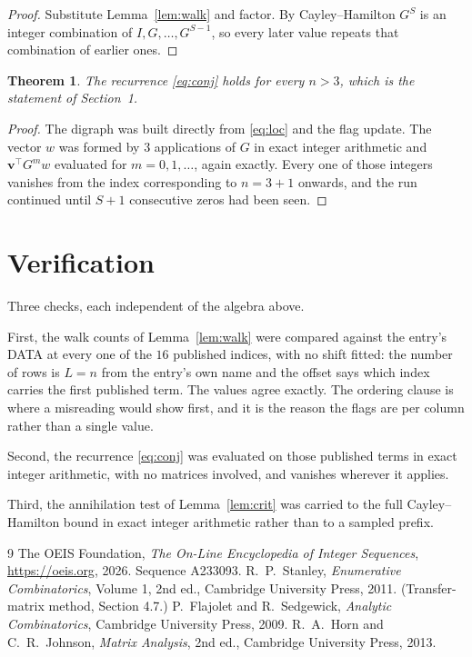 \documentclass[11pt,a4paper]{article}
\theoremstyle{plain}
\newtheorem{theorem}{Theorem}
\theoremstyle{definition}
\begin{document}
\begin{proof}
Substitute Lemma~\ref{lem:walk} and factor. By Cayley--Hamilton $G^{S}$ is an integer
combination of $I,G,\dots,G^{S-1}$, so every later value repeats that combination of earlier
ones.
\end{proof}

\begin{theorem}
The recurrence \eqref{eq:conj} holds for every $n>3$, which is the statement of
Section~1.
\end{theorem}

\begin{proof}
The digraph was built directly from \eqref{eq:loc} and the flag update. The vector $w$ was
formed by $3$ applications of $G$ in exact integer arithmetic and
$\mathbf{v}^{\!\top}G^{m}w$ evaluated for $m=0,1,\dots$, again exactly. Every one of
those integers vanishes from the index corresponding to $n=3+1$ onwards, and the run
continued until $S+1$ consecutive zeros had been seen.
\end{proof}

\section{Verification}

Three checks, each independent of the algebra above.

First, the walk counts of Lemma~\ref{lem:walk} were compared against the entry's DATA at
every one of the $16$ published indices, with no shift fitted: the number of rows is
$L=n$ from the entry's own name and the offset says which index carries the first
published term. The values agree exactly. The ordering clause is where a misreading would
show first, and it is the reason the flags are per column rather than a single value.

Second, the recurrence \eqref{eq:conj} was evaluated on those published terms in exact
integer arithmetic, with no matrices involved, and vanishes wherever it applies.

Third, the annihilation test of Lemma~\ref{lem:crit} was carried to the full
Cayley--Hamilton bound in exact integer arithmetic rather than to a sampled prefix.

\begin{thebibliography}{9}
 The OEIS Foundation, \emph{The On-Line Encyclopedia of Integer
Sequences}, \url{https://oeis.org}, 2026. Sequence A233093.
 R.~P.~Stanley, \emph{Enumerative Combinatorics}, Volume 1, 2nd ed.,
Cambridge University Press, 2011. (Transfer-matrix method, Section 4.7.)
 P.~Flajolet and R.~Sedgewick, \emph{Analytic Combinatorics}, Cambridge
University Press, 2009.
 R.~A.~Horn and C.~R.~Johnson, \emph{Matrix Analysis}, 2nd ed., Cambridge
University Press, 2013.
\end{thebibliography}
\end{document}
